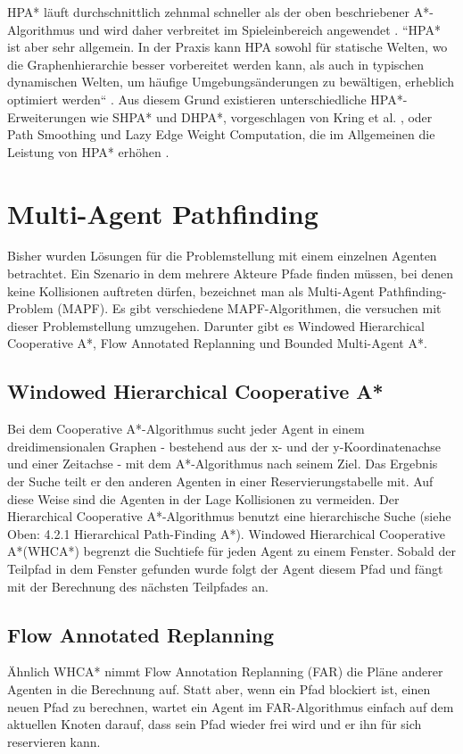 \begin{sloppypar}
HPA* läuft durchschnittlich zehnmal schneller als der oben beschriebener A*-Algorithmus \cite{Bot04} und wird daher verbreitet im Spieleinbereich angewendet \cite{LSC08}. ``HPA* ist aber sehr allgemein. In der Praxis kann HPA sowohl für statische Welten, wo die Graphenhierarchie besser vorbereitet werden kann, als auch in typischen dynamischen Welten, um häufige Umgebungsänderungen zu bewältigen, erheblich optimiert werden`` \cite{Kri10}. Aus diesem Grund existieren unterschiedliche HPA*-Erweiterungen wie SHPA* und DHPA*, vorgeschlagen von Kring et al. \cite{Kri10}, oder Path Smoothing und Lazy Edge Weight Computation, die im Allgemeinen die Leistung von HPA* erhöhen \cite{JB07}.
\end{sloppypar}



\section{Multi-Agent Pathfinding}
Bisher wurden Lösungen für die Problemstellung mit einem einzelnen Agenten betrachtet. Ein Szenario in dem mehrere Akteure Pfade finden müssen, bei denen keine Kollisionen auftreten dürfen, bezeichnet man als Multi-Agent Pathfinding-Problem (MAPF). Es gibt verschiedene MAPF-Algorithmen, die versuchen mit dieser Problemstellung umzugehen. Darunter gibt es Windowed Hierarchical Cooperative A*, Flow Annotated Replanning und Bounded Multi-Agent A*.

\subsection{Windowed Hierarchical Cooperative A*}
Bei dem Cooperative A*-Algorithmus sucht jeder Agent in einem dreidimensionalen Graphen - bestehend aus der x- und der y-Koordinatenachse und einer Zeitachse - mit dem A*-Algorithmus nach seinem Ziel. 
Das Ergebnis der Suche teilt er den anderen Agenten in einer Reservierungstabelle mit. Auf diese Weise sind die Agenten in der Lage Kollisionen zu vermeiden. 
Der Hierarchical Cooperative A*-Algorithmus benutzt eine hierarchische Suche (siehe Oben: 4.2.1 Hierarchical Path-Finding A*). Windowed Hierarchical Cooperative A*(WHCA*) begrenzt die Suchtiefe für jeden Agent zu einem Fenster. Sobald der Teilpfad in dem Fenster gefunden wurde folgt der Agent diesem Pfad und fängt mit der Berechnung des nächsten Teilpfades an.
\subsection{Flow Annotated Replanning}
Ähnlich WHCA* nimmt Flow Annotation Replanning (FAR) die Pläne anderer Agenten in die Berechnung auf. Statt aber, wenn ein Pfad blockiert ist, einen neuen Pfad zu berechnen, wartet ein Agent im FAR-Algorithmus einfach auf dem aktuellen Knoten darauf, dass sein Pfad wieder frei wird und er ihn für sich reservieren kann.

